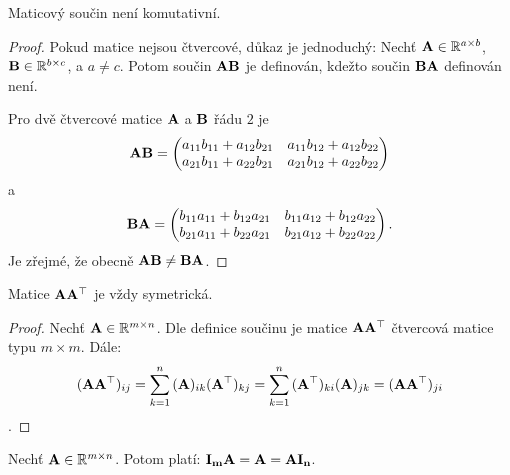 \begin{proposition}
    Maticový součin není komutativní.
\end{proposition}
\begin{proof}
    Pokud matice nejsou čtvercové, důkaz je jednoduchý: Nechť $\mathbf{A} \in 
    \mathbb{R}^{a \times b}$, $\mathbf{B} \in \mathbb{R}^{b \times c}$, a $a
    \neq c$. Potom součin $\mathbf{A}\mathbf{B}$ je definován, kdežto součin 
    $\mathbf{B}\mathbf{A}$ definován není.

    Pro dvě čtvercové matice $\mathbf{A}$ a $\mathbf{B}$ řádu $2$ je
    $$ \mathbf{A}\mathbf{B} = \begin{pmatrix}
        a_{11}b_{11} + a_{12}b_{21} &a_{11}b_{12} + a_{12}b_{22} \\
        a_{21}b_{11} + a_{22}b_{21} &a_{21}b_{12} + a_{22}b_{22}
    \end{pmatrix}$$
    a
    $$ \mathbf{B}\mathbf{A} = \begin{pmatrix}
        b_{11}a_{11} + b_{12}a_{21} &b_{11}a_{12} + b_{12}a_{22} \\
        b_{21}a_{11} + b_{22}a_{21} &b_{21}a_{12} + b_{22}a_{22}
    \end{pmatrix}.$$
    Je zřejmé, že obecně $\mathbf{A}\mathbf{B} \neq \mathbf{B}\mathbf{A}$.
\end{proof}


\begin{proposition}
    Matice $\mathbf{A}\mathbf{A}^\top$ je vždy symetrická.
\end{proposition}
\begin{proof}
    Nechť $\mathbf{A} \in \mathbb{R}^{m \times n}$. Dle definice součinu
    je matice $\mathbf{A}\mathbf{A}^\top$ čtvercová matice typu $m \times m$.
    Dále: $$(\mathbf{A}\mathbf{A}^\top)_{ij} = \sum_{k=1}^{n}{(\mathbf{A})_{ik}
    (\mathbf{A}^\top)_{kj}} = \sum_{k=1}^{n}{(\mathbf{A}^\top)_{ki}(\mathbf{A})_{jk}} =
    (\mathbf{A}\mathbf{A}^\top)_{ji}$$.
\end{proof}

\begin{proposition}
    Nechť $\mathbf{A} \in \mathbb{R}^{m \times n}$. Potom platí:
    $\mathbf{I_m}\mathbf{A} = \mathbf{A} = \mathbf{A}\mathbf{I_n}$.
\end{proposition}

